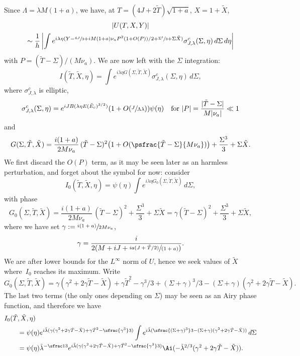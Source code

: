 Since $\Lambda=\lambda M(1+a)$, we have, at $T=(4J+2\tilde T)\sqrt{1+a}$, $X=1+\tilde X$,
\begin{multline}
\label{eq:71}
|U(T,X,Y)|\\
\sim \frac 1h \left| \int e^{i\lambda\eta (Y-\sfrac{4J}{3}+i M (1+a) \nu_a P^{2}(1+O(P))/2 +\sfrac{\Sigma^{3}}{3}+\Sigma\tilde X)}\sigma^{c}_{J,\lambda}(\Sigma,\eta)\,d\Sigma \,d\eta \right|
\end{multline}
with $P=(\tilde T-\Sigma)/(M\nu_a)$. We are now left with the $\Sigma$ integration:
\begin{equation}
\label{eq:72}
I(\tilde T,\tilde X,\eta)=\int e^{i\lambda \eta G(\Sigma,\tilde T,\tilde X)}\sigma^{c}_{J,\lambda}(\Sigma,\eta)\,d\Sigma,
\end{equation}
where $\sigma^{c}_{J,\lambda}$ is elliptic,
\[
\sigma^{c}_{J,\lambda}(\Sigma,\eta)=e^{iJB(\lambda\eta E(\tilde E_c)^{3/2})}(1+O(\sfrac{J}{\Lambda\lambda}))\psi(\eta)\quad\text{for }|P|=\frac{|\tilde T-\Sigma|}{M|\nu_a|}\ll 1
\]
and
\begin{equation}
\label{eq:73}
G(\Sigma, \tilde T, \tilde X)=\frac{i(1+a)}{2M\nu_a}\, (\tilde T-\Sigma)^{2}\bigl(1+O(\psfrac{\tilde T-\Sigma}{M\nu_a})\bigr) +\frac{\Sigma^{3}}{3}+\Sigma\tilde X.
\end{equation}
We first discard the $O(P)$ term, as it may be seen later as an harmless perturbation, and forget about the symbol for now: consider
\begin{equation}
\label{eq:72bis}
I_{0}(\tilde T,\tilde X,\eta)=\psi(\eta)\int e^{i\lambda \eta G_{0}(\Sigma,\tilde T,\tilde X)}\,d\Sigma,
\end{equation}
with phase
\begin{equation}
\label{eq:73bis}
G_{0}(\Sigma,\tilde T, \tilde X)=\frac{i(1+a)}{2 M \nu_a}\, (\tilde T-\Sigma)^{2}+\frac{\Sigma^{3}}{3}+\Sigma\tilde X=\gamma (\tilde T-\Sigma)^2+\frac{\Sigma^3}{3}+\Sigma \tilde X,
\end{equation}
where we have set $\gamma:= \sfrac{i(1+a)}{2 M \nu_a}$, \ie
\[
\gamma=\frac{i}{2(M+i J+ \sfrac{ia(J+\tilde T/2)}{(1+a)})}.
\]
We are after lower bounds for the $L^{\infty}$ norm of $U$, hence we seek values of $\tilde X$ where~$I_0$ reaches its maximum. Write
\[
G_{0}(\Sigma,\tilde T, \tilde X)=\gamma(\gamma^2+2\gamma \tilde T-\tilde X)+\gamma \tilde T^2-\gamma^3/3+ (\Sigma+\gamma)^3/3-(\Sigma+\gamma)(\gamma^2+2\gamma \tilde T-\tilde X).
\]
The last two terms (the only ones depending on $\Sigma$) may be seen as an Airy phase function, and therefore we have
\begin{equation}\label{Airybound}
\begin{split}
I_0(\tilde T&,\tilde X,\eta)\\
&= \psi(\eta)e^{i\tilde \lambda (\gamma(\gamma^2+2\gamma \tilde T-\tilde X)+\gamma \tilde T^2-\sfrac{\gamma^3}3)}\int e^{i\tilde \lambda (\sfrac{(\Sigma+\gamma)^3}3-(\Sigma+\gamma)(\gamma^2+2\gamma \tilde T-\tilde X))} \,d\Sigma\\
&= \psi(\eta)\tilde\lambda^{-\sfrac 13}e^{i\tilde \lambda (\gamma(\gamma^2+2\gamma \tilde T-\tilde X)+\gamma \tilde T^2-\sfrac {\gamma^3}3)}\Ai(-\tilde\lambda^{2/3}(\gamma^2+2\gamma \tilde T-\tilde X)).
\end{split}
\end{equation}
